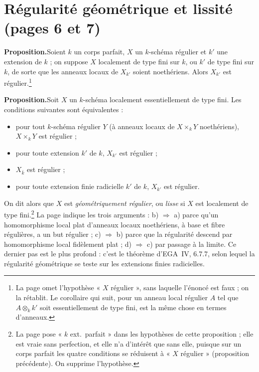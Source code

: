 \documentclass[11pt,a4paper]{article}
\begin{document}
\section*{Régularité géométrique et lissité (pages 6 et 7)}

\textbf{Proposition.}\quad Soient $k$ un corps parfait, $X$ un $k$-schéma régulier et $k'$ une extension
de $k$ ; on suppose $X$ localement de type fini sur $k$, ou $k'$ de type fini
sur $k$, de sorte que les anneaux locaux de $X_{k'}$ soient noethériens.
Alors $X_{k'}$ est régulier.\footnote{La page omet l'hypothèse « $X$
régulier », sans laquelle l'énoncé est faux ; on la rétablit. Le corollaire
qui suit, pour un anneau local régulier $A$ tel que $A \otimes_{k} k'$ soit
essentiellement de type fini, est la même chose en termes d'anneaux.}

\textbf{Proposition.}\quad Soit $X$ un $k$-schéma localement essentiellement de type fini. Les
conditions suivantes sont équivalentes :
\begin{itemize}
\item[a)] pour tout $k$-schéma régulier $Y$ (à anneaux locaux de
$X \times_{k} Y$ noethériens), $X \times_{k} Y$ est régulier ;
\item[b)] pour toute extension $k'$ de $k$, $X_{k'}$ est régulier ;
\item[c)] $X_{\bar k}$ est régulier ;
\item[d)] pour toute extension finie radicielle $k'$ de $k$, $X_{k'}$ est
régulier.
\end{itemize}

On dit alors que $X$ est \emph{géométriquement régulier}, ou \emph{lisse} si
$X$ est localement de type fini.\footnote{La page pose « $k$ ext.\
parfait » dans les hypothèses de cette proposition ; elle est
vraie sans perfection, et elle n'a d'intérêt que sans elle, puisque sur un
corps parfait les quatre conditions se réduisent à « $X$ régulier »
(proposition précédente). On supprime l'hypothèse.}
La page indique les trois arguments : b) $\Rightarrow$ a) parce qu'un
homomorphisme local plat d'anneaux locaux noethériens, à base et fibre
régulières, a un but régulier ; c) $\Rightarrow$ b) parce que la régularité
descend par homomorphisme local fidèlement plat ; d) $\Rightarrow$ c) par
passage à la limite. Ce dernier pas est le plus profond : c'est le théorème
d'EGA~IV, 6.7.7, selon lequel la régularité géométrique se teste sur les
extensions finies radicielles.
\end{document}
